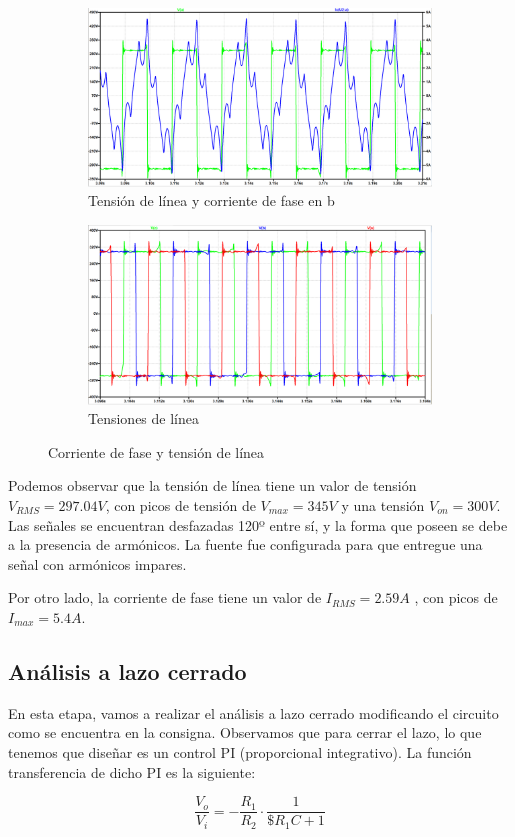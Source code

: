 \documentclass[e4_tp3_main.tex]{subfiles}
\begin{document}
\begin{figure}[H]
  \begin{subfigure}[b]{0.49\textwidth}
  \centering
    \includegraphics[width=0.9\linewidth]{Imagenes/3-1-a-linea.png}
    \caption{Tensi\'on de l\'inea y corriente de fase en b}
    \label{fig:f1}
  \end{subfigure}
  \hfill
  \begin{subfigure}[b]{0.49\textwidth}
  \centering
    \includegraphics[width=0.9\linewidth]{Imagenes/3-1-a-lineas.png}
    \caption{Tensiones de l\'inea}
    \label{fig:f2}
  \end{subfigure}
  \caption{Corriente de fase y tensi\'on de l\'inea}
\end{figure}


Podemos observar que la tensión de línea tiene un valor de tensión $V_{RMS}=297.04V$, con picos de tensión de $V_{max}=345 V$ y una tensión $V_{on}=300V$. 
Las señales se encuentran desfazadas 120º entre sí, y la forma que poseen se debe a la presencia de armónicos. La fuente fue configurada para que entregue una señal con arm\'onicos impares.

Por otro lado, la corriente de fase tiene un valor de $I_{RMS}=2.59A$ , con picos de $I_{max}=5.4A$. 

\subsection{Análisis a lazo cerrado}
En esta etapa, vamos a realizar el análisis a lazo cerrado modificando el circuito como se encuentra en la consigna.
Observamos que para cerrar el lazo, lo que tenemos que diseñar es un control PI (proporcional integrativo). La función transferencia de dicho PI es la siguiente:

$$\frac{V_o}{V_i}=-\frac{R_1}{R_2} \cdot \frac{1}{\$ R_1 C + 1} $$
\end{document}
